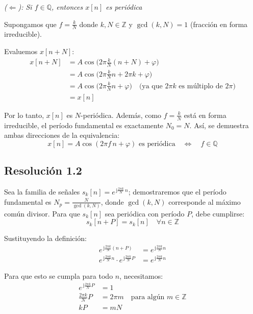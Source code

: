 \documentclass[
  11pt,
  letterpaper,
   addpoints,
   answers
  ]{exam}
\begin{document}
\begin{questions}
\begin{solution}
\emph{(\(\Leftarrow\)): Si \(f \in \mathbb{Q}\), entonces \(x[n]\) es periódica}

Supongamos que \(f = \frac{k}{N}\) donde \(k, N \in \mathbb{Z}\) y \(\gcd(k,N) = 1\) (fracción en forma irreducible).

Evaluemos \(x[n+N]\):
\begin{align}
x[n+N] &= A\cos\!\Big(2\pi \frac{k}{N}(n+N)+\varphi\Big) \\
&= A\cos\!\Big(2\pi\frac{k}{N}n + 2\pi k + \varphi\Big) \\
&= A\cos\!\big(2\pi\frac{k}{N}n + \varphi\big) \quad \text{(ya que } 2\pi k \text{ es múltiplo de } 2\pi\text{)} \\
&= x[n]
\end{align}

Por lo tanto, \(x[n]\) es \(N\)-periódica. Además, como \(f = \frac{k}{N}\) está en forma irreducible, el período fundamental es exactamente \(N_0 = N\). Así, se demuestra ambas direcciones de la equivalencia:
\begin{equation}
\boxed{x[n] = A\cos(2\pi f\,n+\varphi) \text{ es periódica} \quad \Longleftrightarrow \quad f \in \mathbb{Q}}
\end{equation}

\subsection*{Resolución 1.2}

Sea la familia de señales \(s_k[n] = e^{\,\mathrm{j}\frac{2\pi k}{N}\,n}\); demostraremos que el período fundamental es \(N_p = \frac{N}{\gcd(k,N)}\), donde $\gcd(k,N)$ corresponde al máximo común divisor. Para que \(s_k[n]\) sea periódica con período \(P\), debe cumplirse:
\begin{equation}
s_k[n+P] = s_k[n] \quad \forall n \in \mathbb{Z}
\end{equation}

Sustituyendo la definición:
\begin{align}
e^{\,\mathrm{j}\frac{2\pi k}{N}(n+P)} &= e^{\,\mathrm{j}\frac{2\pi k}{N}n} \\
e^{\,\mathrm{j}\frac{2\pi k}{N}n} \cdot e^{\,\mathrm{j}\frac{2\pi k}{N}P} &= e^{\,\mathrm{j}\frac{2\pi k}{N}n}
\end{align}

Para que esto se cumpla para todo \(n\), necesitamos:
\begin{align}
e^{\,\mathrm{j}\frac{2\pi k}{N}P} &= 1 \\
\frac{2\pi k}{N}P &= 2\pi m \quad \text{para algún } m \in \mathbb{Z} \\
kP &= mN \label{eq:condicion_periodo}
\end{align}


\end{solution}
\end{questions}
\end{document}
